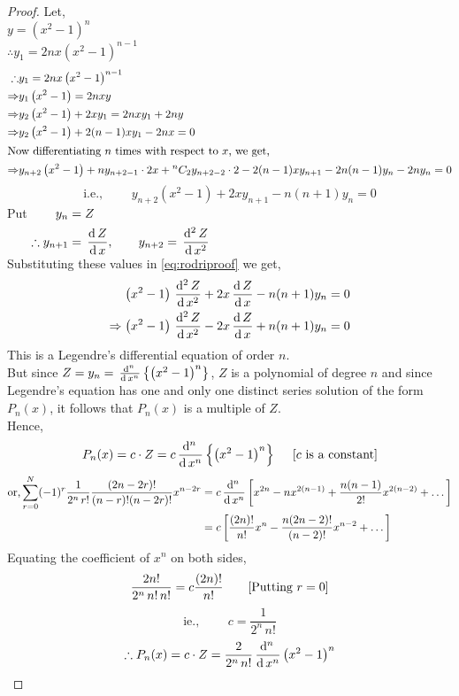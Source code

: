 \documentclass[../main-sheet.tex]{subfiles}
\begin{document}
\begin{proof}
    Let,\\
    \indent $ y=\left(x^2-1\right)^n $\\
    \indent $ \therefore y_1=2nx\left(x^2-1\right)^{n-1} $
    \begin{align*}
        \therefore& y_1=2nx\left(x^2-1\right)^{n-1}\\
        \Rightarrow & y_1 \left(x^2-1\right)=2nxy\\
        \Rightarrow & y_2 \left(x^2-1\right)+2xy_1=2nxy_1+2ny\\
        \Rightarrow & y_2 \left(x^2-1\right)+2(n-1)xy_1-2nx=0\\
        \intertext{Now differentiating $ n $ times with respect to $ x $, we get,}
        \Rightarrow & y_{n+2} \left(x^2-1\right)+ny_{n+2-1}\cdot 2x+ {}^{n}C_2 y_{n+2-2}\cdot 2-2(n-1)xy_{n+1}-2n(n-1)y_n-2ny_n=0
    \end{align*}
    \begin{equation}
        \text{i.e., }\qquad y_{n+2} \left(x^2-1\right)+2xy_{n+1}-n(n+1)y_n=0
        \label{eq:rodriproof}
    \end{equation}
    Put $ \begin{aligned}[t]
        y_n&=Z\\
        \therefore y_{n+1}&=\,\frac{\mathrm{d}\,Z}{\mathrm{d}\,x},\qquad y_{n+2}=\,\frac{\mathrm{d}^{2}\, Z}{\mathrm{d}\, x^{2}}
    \end{aligned} $\\
    Substituting these values in \eqref{eq:rodriproof} we get,
    \begin{align*}
        \left(x^2-1\right)\,\frac{\mathrm{d}^{2}\, Z}{\mathrm{d}\, x^{2}}+2x\,\frac{\mathrm{d}\,Z}{\mathrm{d}\,x}-n(n+1)y_n &=0\\
        \Rightarrow \left(x^2-1\right)\,\frac{\mathrm{d}^{2}\, Z}{\mathrm{d}\, x^{2}}-2x\,\frac{\mathrm{d}\,Z}{\mathrm{d}\,x}+n(n+1)y_n &=0
    \end{align*}
    This is a Legendre's differential equation of order $ n $.\\
    But since $ Z=y_n=\,\frac{\mathrm{d}^{n}\, }{\mathrm{d}\, x^{n}}\left\{\left(x^2-1\right)^n\right\} $, $ Z $ is a polynomial of degree $ n $ and since Legendre's equation has one and only one distinct series solution of the form $ P_n(x) $, it follows that $ P_n(x) $ is a multiple of $ Z $.\\
    Hence,
    \[ 
        P_n(x)=c\cdot Z=c\,\frac{\mathrm{d}^{n}\, }{\mathrm{d}\, x^{n}}\left\{\left(x^2-1\right)^n\right\} \quad \text{ [$ c $ is a constant]}
    \]
    \begin{align*}
        \text{or,} \sum_{r=0}^{N} (-1)^r \frac{1}{2^n\,r!}\frac{(2n-2r)!}{(n-r)!(n-2r)!}x^{n-2r}&=c\,\frac{\mathrm{d}^{n}\, }{\mathrm{d}\, x^{n}}\left[x^{2n}-nx^{2(n-1)}+\frac{n(n-1)}{2!}x^{2(n-2)}+\dots \right]\\
        &= c\left[\frac{(2n)!}{n!}x^n-\frac{n(2n-2)!}{(n-2)!}x^{n-2}+\dots\right]
    \end{align*}
    Equating the coefficient of $ x^n $ on both sides,
    \[
        \frac{2n!}{2^n\,n!\,n!}=c\frac{(2n)!}{n!}\qquad\text{[Putting $ r=0 $]}
    \]
    \[
        \text{ie., } \qquad c=\frac{1}{2^n\,n!}
    \]
    \[
        \therefore P_n(x)=c\cdot Z=\frac{2}{2^n\,n!}\,\frac{\mathrm{d}^{n}\, }{\mathrm{d}\, x^{n}}\left(x^2-1\right)^n
    \]
\end{proof}
\end{document}
